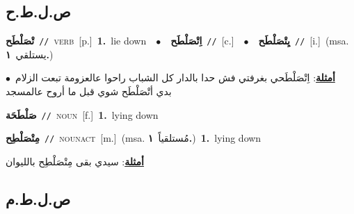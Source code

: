\documentclass[10pt,a4paper,twoside]{article} %
\begin{document}
\begin{multicols}{2}
\vspace{-3mm}
\subsection*{\color{blue}\foreignlanguage{arabic}{ص.ل.ط.ح}\color{blue}{}} 

{\setlength\topsep{0pt}\textbf{\foreignlanguage{arabic}{تْصَلْطَح}}\ {\color{gray}\texttt{//}\color{black}}\ \textsc{verb}\ [p.]\ \textbf{1.}~lie down\ \ $\bullet$\ \ \setlength\topsep{0pt}\textbf{\foreignlanguage{arabic}{اِتْصَلْطَح}}\ {\color{gray}\texttt{//}\color{black}}\ [c.]\ \ $\bullet$\ \ \setlength\topsep{0pt}\textbf{\foreignlanguage{arabic}{يِتْصَلْطَح}}\ {\color{gray}\texttt{//}\color{black}}\ [i.]\ \color{gray}(msa. \foreignlanguage{arabic}{يستلقي}~\foreignlanguage{arabic}{\textbf{١.}})\color{black}\  \begin{flushright}\color{gray}\foreignlanguage{arabic}{\textbf{\underline{\foreignlanguage{arabic}{أمثلة}}}: اِتْصَلْطَحي بغرفتي فش حدا بالدار كل الشباب راحوا عالعزومة تبعت الزلام\ $\bullet$\ \  بدي أتْصَلْطَح شوي قبل ما أروح عالمسجد}\end{flushright}\color{black}} \vspace{2mm}

{\setlength\topsep{0pt}\textbf{\foreignlanguage{arabic}{صَلْطَحَة}}\ {\color{gray}\texttt{//}\color{black}}\ \textsc{noun}\ [f.]\ \textbf{1.}~lying down\ } \vspace{2mm}

{\setlength\topsep{0pt}\textbf{\foreignlanguage{arabic}{مِتْصَلْطِح}}\ {\color{gray}\texttt{//}\color{black}}\ \textsc{noun\textunderscore act}\ [m.]\ \color{gray}(msa. \foreignlanguage{arabic}{مُستلقياً}~\foreignlanguage{arabic}{\textbf{١.}})\color{black}\ \textbf{1.}~lying down\  \begin{flushright}\color{gray}\foreignlanguage{arabic}{\textbf{\underline{\foreignlanguage{arabic}{أمثلة}}}: سيدي بقى مِتْصَلْطِح بالليوان}\end{flushright}\color{black}} \vspace{2mm}

\vspace{-3mm}
\subsection*{\color{blue}\foreignlanguage{arabic}{ص.ل.ط.م}\color{blue}{}} 


\end{multicols}
\end{document}
